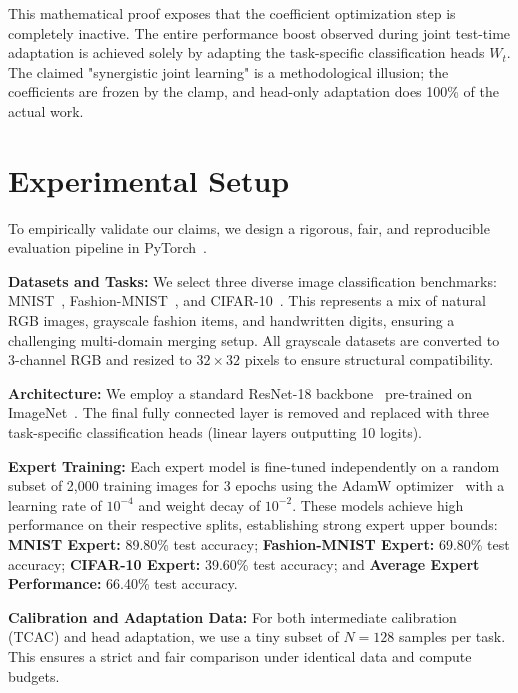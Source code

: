 \documentclass{article}
\theoremstyle{plain}
\theoremstyle{definition}
\theoremstyle{remark}
\begin{document}
This mathematical proof exposes that the coefficient optimization step is completely inactive. The entire performance boost observed during joint test-time adaptation is achieved solely by adapting the task-specific classification heads $W_t$. The claimed "synergistic joint learning" is a methodological illusion; the coefficients are frozen by the clamp, and head-only adaptation does 100\% of the actual work.

\section{Experimental Setup}
\label{sec:setup}

To empirically validate our claims, we design a rigorous, fair, and reproducible evaluation pipeline in PyTorch~\cite{paszke2019pytorch}.

\textbf{Datasets and Tasks:} We select three diverse image classification benchmarks: MNIST~\cite{lecun1998gradient}, Fashion-MNIST~\cite{xiao2017fashion}, and CIFAR-10~\cite{krizhevsky2009learning}. This represents a mix of natural RGB images, grayscale fashion items, and handwritten digits, ensuring a challenging multi-domain merging setup. All grayscale datasets are converted to 3-channel RGB and resized to $32 \times 32$ pixels to ensure structural compatibility.

\textbf{Architecture:} We employ a standard ResNet-18 backbone~\cite{he2016deep} pre-trained on ImageNet~\cite{deng2009imagenet}. The final fully connected layer is removed and replaced with three task-specific classification heads (linear layers outputting 10 logits).

\textbf{Expert Training:} Each expert model is fine-tuned independently on a random subset of 2,000 training images for 3 epochs using the AdamW optimizer~\cite{loshchilov2017decoupled} with a learning rate of $10^{-4}$ and weight decay of $10^{-2}$. These models achieve high performance on their respective splits, establishing strong expert upper bounds: \textbf{MNIST Expert:} 89.80\% test accuracy; \textbf{Fashion-MNIST Expert:} 69.80\% test accuracy; \textbf{CIFAR-10 Expert:} 39.60\% test accuracy; and \textbf{Average Expert Performance:} 66.40\% test accuracy.

\textbf{Calibration and Adaptation Data:} For both intermediate calibration (TCAC) and head adaptation, we use a tiny subset of $N = 128$ samples per task. This ensures a strict and fair comparison under identical data and compute budgets.
\end{document}
